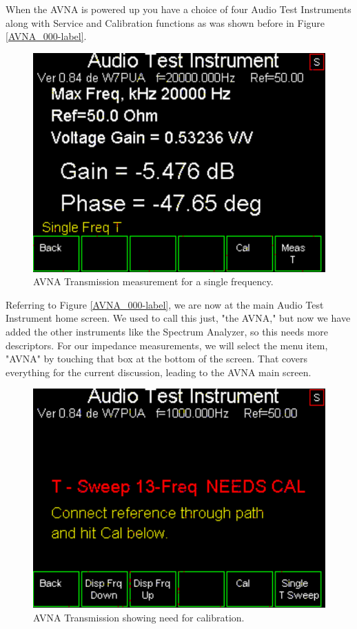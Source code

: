 When the AVNA is powered up you have a choice of four Audio Test Instruments along with Service and Calibration functions as was shown before in Figure \ref{AVNA_000-label}.

\begin{figure}[H]
\begin{center}
\includegraphics[scale=0.75]{./images/AVNA_029.pdf}
\caption{AVNA Transmission measurement for a single frequency.}
\label{AVNA_029-label}
\end{center}
\end{figure}
%
Referring to Figure \ref{AVNA_000-label}, we are now at the main Audio Test Instrument home screen.
We used to call this just, "the AVNA," but now we have added the other instruments like the Spectrum Analyzer, so this needs more descriptors.
For our impedance measurements, we will select the menu item, "AVNA" by touching that box at the bottom of the screen.
That  covers everything for the current discussion, leading to the AVNA main screen.

\begin{figure}[H]
\begin{center}
\includegraphics[scale=0.75]{./images/AVNA_031.pdf}
\caption{AVNA Transmission showing need for calibration.}
\label{AVNA_031-label}
\end{center}
\end{figure}
%


